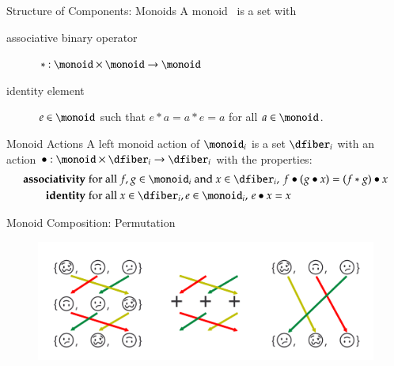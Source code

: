 \documentclass[xcolor={dvipsnames}, handout]{beamer}
\begin{document}
\begin{frame}{Structure of Components: Monoids}
A monoid \monoid\ is a set with
\begin{description}
    \item[associative binary operator] $\ast:\monoid \times \monoid\rightarrow \monoid$
    \item[identity element] $e\in \monoid$ such that $e\ast a= a \ast e = a$ for all $a \in \monoid$. 
\end{description}
\end{frame}
\begin{frame}{Monoid Actions}
A left monoid action of $\monoid_i$ is a set $\dfiber_i$ with an action $\bullet: \monoid\times \dfiber_i \rightarrow \dfiber_i$ with the properties:
    \begin{align*}
        \textbf{associativity}\;& \text{for all } f,g \in \monoid_i \text{ and } x\in \dfiber_i,\, f\bullet(g\bullet x) = (f\ast g) \bullet x\\
        \textbf{identity}\;& \text{for all } x\in \dfiber_i, e\in \monoid_i,\,  e\bullet x = x 
    \end{align*}
\end{frame}

\begin{frame}{Monoid Composition: Permutation}
    \begin{figure}
        \includegraphics[width=1\linewidth]{figures/math/monoid_emoji.png}
    \end{figure}
\end{frame}
\end{document}
